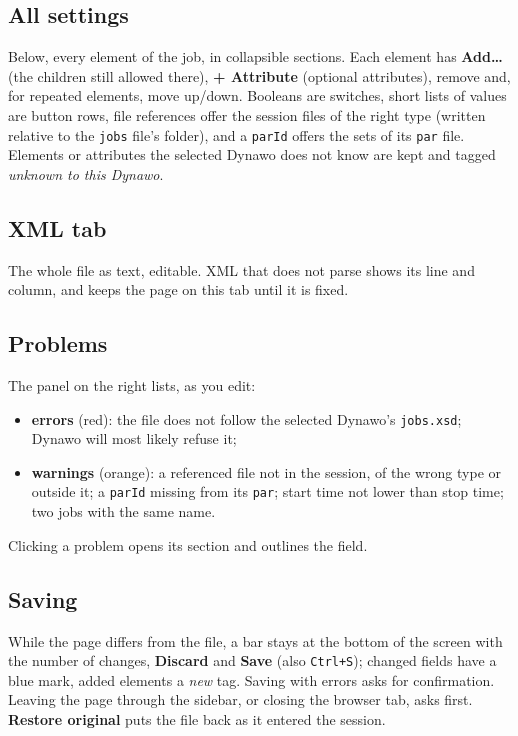 \documentclass[a4paper,11pt]{article}
\newcommand{\code}[1]{\texttt{\small #1}}
\newcommand{\ftype}[1]{\texttt{\small\color{rteblu}#1}}
\begin{document}
\subsection{All settings}

Below, every element of the job, in collapsible sections. Each element has
\textbf{Add\ldots} (the children still allowed there), \textbf{+ Attribute}
(optional attributes), remove and, for repeated elements, move up/down.
Booleans are switches, short lists of values are button rows, file
references offer the session files of the right type (written relative to the
\ftype{jobs} file's folder), and a \code{parId} offers the sets of its
\ftype{par} file. Elements or attributes the selected Dynawo does not know
are kept and tagged \emph{unknown to this Dynawo}.

\subsection{XML tab}

The whole file as text, editable. XML that does not parse shows its line and
column, and keeps the page on this tab until it is fixed.

\subsection{Problems}

The panel on the right lists, as you edit:
\begin{itemize}[leftmargin=2em]
  \item \textbf{errors} (red): the file does not follow the selected Dynawo's
    \code{jobs.xsd}; Dynawo will most likely refuse it;
  \item \textbf{warnings} (orange): a referenced file not in the session, of
    the wrong type or outside it; a \code{parId} missing from its \ftype{par};
    start time not lower than stop time; two jobs with the same name.
\end{itemize}
Clicking a problem opens its section and outlines the field.

\subsection{Saving}

While the page differs from the file, a bar stays at the bottom of the screen
with the number of changes, \textbf{Discard} and \textbf{Save} (also
\code{Ctrl+S}); changed fields have a blue mark, added elements a \emph{new}
tag. Saving with errors asks for confirmation. Leaving the page through the
sidebar, or closing the browser tab, asks first. \textbf{Restore original}
puts the file back as it entered the session.
\end{document}

